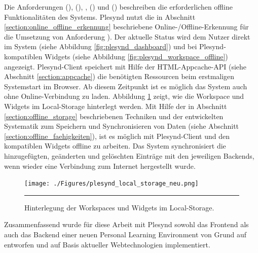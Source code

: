 Die Anforderungen  (\emph{\requirementCheckOnlineStatus}),  (\emph{\requirementOnlineStatusInformUser}),  \emph{\requirementOfflineStart},  (\emph{\requirementOfflineWork}) und  (\emph{\requirementOnlineSync}) beschreiben die erforderlichen offline Funktionalitäten des Systems. Plesynd nutzt die in Abschnitt \ref{section:online_offline_erkennung} beschriebene Online-/Offline-Erkennung für die Umsetzung von Anforderung ). Der aktuelle Status wird dem Nutzer direkt im System (siehe Abbildung \ref{fig:plesynd_dashboard}) und bei Plesynd-kompatiblen Widgets (siehe Abbildung \ref{fig:plesynd_workspace_offline}) angezeigt. Plesynd-Client speichert mit Hilfe der HTML-Appcache-API (siehe Abschnitt \ref{section:appcache}) die benötigten Ressourcen beim erstmaligen Systemstart im Browser. Ab diesem Zeitpunkt ist es möglich das System auch ohne Online-Verbindung zu laden. Abbildung \ref{fig:plesynd_local_storage} zeigt, wie die Workspace und Widgets im Local-Storage hinterlegt werden. Mit Hilfe der in Abschnitt \ref{section:offline_storage} beschriebenen Techniken und der entwickelten Systematik zum Speichern und Synchronisieren von Daten (siehe Abschnitt \ref{section:offline_faehigkeiten}), ist es möglich mit Plesynd-Client und den kompatiblen Widgets offline zu arbeiten. Das System synchronisiert die hinzugefügten, geänderten und gelöschten Einträge mit den jeweiligen Backends, wenn wieder eine Verbindung zum Internet hergestellt wurde.
\begin{figure}
  \centering
  \texttt{[image: ./Figures/plesynd\_local\_storage\_neu.png]}
    \rule{35em}{0.5pt}
  \caption[Workspaces und Widgets im Local-Storage]{Hinterlegung der Workspaces und Widgets im Local-Storage.}
  \label{fig:plesynd_local_storage}
\end{figure}








Zusammenfassend wurde für diese Arbeit mit Plesynd sowohl das Frontend als auch das Backend einer neuen Personal Learning Environment von Grund auf entworfen und auf Basis aktueller Webtechnologien implementiert.
